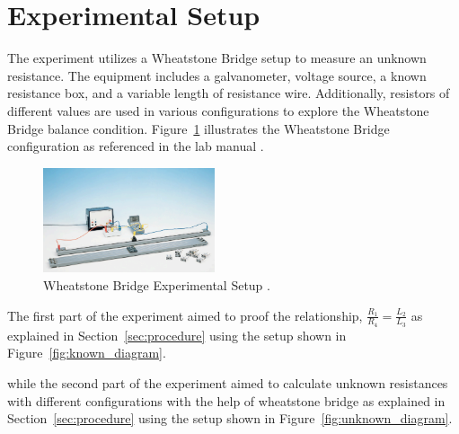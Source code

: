\documentclass[journal]{IEEEtran}
\begin{document}
\section{Experimental Setup}
\label{sec:setup}
The experiment utilizes a Wheatstone Bridge setup to measure an unknown resistance. The equipment includes a galvanometer, voltage source, a known resistance box, and a variable length of resistance wire. Additionally, resistors of different values are used in various configurations to explore the Wheatstone Bridge balance condition. Figure~\ref{fig:setup} illustrates the Wheatstone Bridge configuration as referenced in the lab manual \cite{lab_manual}.

\begin{figure}[H]
    \centering
    \includegraphics[width=0.45\textwidth]{IMAGES/wheatstone_bridge.png} %
    \caption{Wheatstone Bridge Experimental Setup \cite{lab_manual}.}
    \label{fig:setup}
\end{figure}

The first part of the experiment aimed to proof the relationship, $\frac{R_1}{R_4} = \frac{L_2}{L_3}$ as explained in Section~\ref{sec:procedure} 
using the setup shown in Figure~\ref{fig:known_diagram}. 

while the second part of the experiment aimed to calculate unknown resistances with different configurations 
with the help of wheatstone bridge as explained in Section~\ref{sec:procedure} 
using the setup shown in Figure~\ref{fig:unknown_diagram}. 
\end{document}
